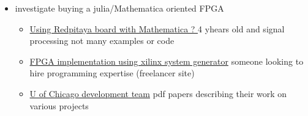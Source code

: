 \documentclass[hyperref]{labbook}
\begin{document}
\begin{itemize}
\item investigate buying a julia/Mathematica oriented FPGA
  \begin{itemize}
  \item \href{https://community.wolfram.com/groups/-/m/t/563691}{ Using Redpitaya board with Mathematica ? } 4 yhears old  and signal processing not many examples or code
  \item
   \href{https://www.freelancer.com/projects/matlab-mathematica/fpga-implementation-using-xilinx-system/}{
FPGA implementation using xilinx system generator}  someone looking to hire programming expertise  (freelancer site)
\item \href{http://simonlab.uchicago.edu/FPGA.html}{U of Chicago development team}  pdf papers describing their work on various projects
  \end{itemize}
\end{itemize}




\printindex
\end{document}
